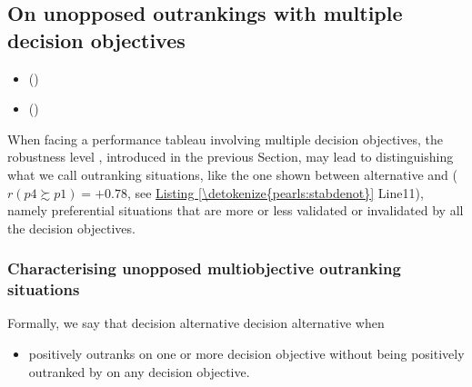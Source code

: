 \documentclass[a4paper,12pt,english]{sphinxhowto}
\begin{document}
\subsection{On unopposed outrankings with multiple decision objectives}
\label{\detokenize{pearls:on-unopposed-outrankings-with-multiple-decision-objectives}}\label{\detokenize{pearls:unopposed-outranking-tutorial-label}}
\begin{sphinxcontents}
\begin{itemize}
\item {} 
\sphinxAtStartPar
{}\label{\detokenize{pearls:id116}}{\hyperref[\detokenize{pearls:characterising-unopposed-multiobjective-outranking-situations}]{}} ()

\item {} 
\sphinxAtStartPar
{}\label{\detokenize{pearls:id117}}{\hyperref[\detokenize{pearls:computing-unopposed-multiobjective-choice-recommendations}]{}} ()

\end{itemize}
\end{sphinxcontents}

\sphinxAtStartPar
When facing a performance tableau involving multiple decision objectives, the robustness level , introduced in the previous Section, may lead to distinguishing what we call  outranking situations, like the one shown between alternative  and  (\(r(p4 \succsim p1) = +0.78\), see \hyperref[\detokenize{pearls:stabdenot}]{Listing \ref{\detokenize{pearls:stabdenot}}} Line11), namely preferential situations that are more or less validated or invalidated by all the decision objectives.


\subsubsection{Characterising unopposed multiobjective outranking situations}
\label{\detokenize{pearls:characterising-unopposed-multiobjective-outranking-situations}}
\sphinxAtStartPar
Formally, we say that decision alternative   decision alternative   when
\begin{itemize}
\item {} 
\sphinxAtStartPar
{} positively outranks  on one or more decision objective without  being positively outranked by  on any decision objective.

\end{itemize}
\end{document}
